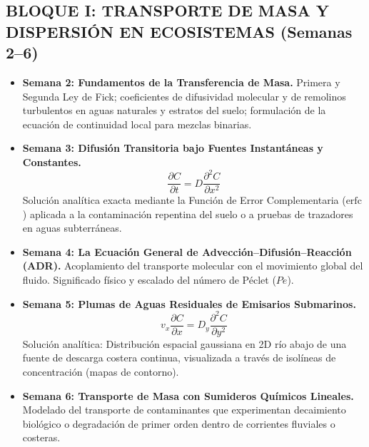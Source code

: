 \subsection{BLOQUE I: TRANSPORTE DE MASA Y DISPERSIÓN EN ECOSISTEMAS (Semanas 2–6)}
\begin{itemize}
    \item \textbf{Semana 2: Fundamentos de la Transferencia de Masa.} Primera y Segunda Ley de Fick;
coeficientes de difusividad molecular y de remolinos turbulentos en aguas naturales y estratos del suelo;
formulación de la ecuación de continuidad local para mezclas binarias.
    \item \textbf{Semana 3: Difusión Transitoria bajo Fuentes Instantáneas y Constantes.}
    \begin{equation*}
        \frac{\partial C}{\partial t} = D \frac{\partial^2 C}{\partial x^2}
    \end{equation*}
    Solución analítica exacta mediante la Función de Error Complementaria ($\text{erfc}$) aplicada a la contaminación repentina del suelo o a pruebas de trazadores en aguas subterráneas.
\item \textbf{Semana 4: La Ecuación General de Advección--Difusión--Reacción (ADR).} Acoplamiento del transporte molecular con el movimiento global del fluido.
Significado físico y escalado del número de Péclet ($Pe$).
    \item \textbf{Semana 5: Plumas de Aguas Residuales de Emisarios Submarinos.}
    \begin{equation*}
        v_x \frac{\partial C}{\partial x} = D_y \frac{\partial^2 C}{\partial y^2}
    \end{equation*}
    Solución analítica: Distribución espacial gaussiana en 2D río abajo de una fuente de descarga costera continua, visualizada a través de isolíneas de concentración (mapas de contorno).
\item \textbf{Semana 6: Transporte de Masa con Sumideros Químicos Lineales.} Modelado del transporte de contaminantes que experimentan decaimiento biológico o degradación de primer orden dentro de corrientes fluviales o costeras.
\end{itemize}

